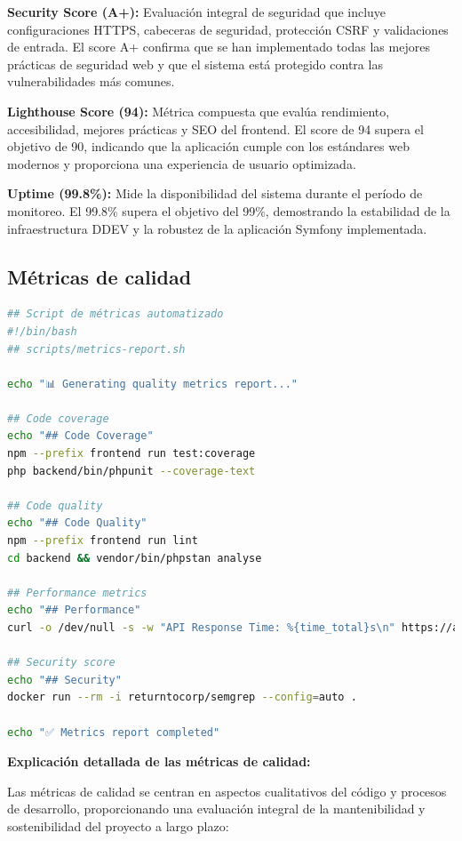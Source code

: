 \documentclass[12pt,a4paper,oneside]{report}
\begin{document}
\textbf{Security Score (A+):} Evaluación integral de seguridad que incluye configuraciones HTTPS, cabeceras de seguridad, protección CSRF y validaciones de entrada. El score A+ confirma que se han implementado todas las mejores prácticas de seguridad web y que el sistema está protegido contra las vulnerabilidades más comunes.

\textbf{Lighthouse Score (94):} Métrica compuesta que evalúa rendimiento, accesibilidad, mejores prácticas y SEO del frontend. El score de 94 supera el objetivo de 90, indicando que la aplicación cumple con los estándares web modernos y proporciona una experiencia de usuario optimizada.

\textbf{Uptime (99.8\%):} Mide la disponibilidad del sistema durante el período de monitoreo. El 99.8\% supera el objetivo del 99\%, demostrando la estabilidad de la infraestructura DDEV y la robustez de la aplicación Symfony implementada.

\subsection{Métricas de calidad}\label{muxe9tricas-de-calidad}

\begin{lstlisting}[language=bash]
## Script de métricas automatizado
#!/bin/bash
## scripts/metrics-report.sh

echo "📊 Generating quality metrics report..."

## Code coverage
echo "## Code Coverage"
npm --prefix frontend run test:coverage
php backend/bin/phpunit --coverage-text

## Code quality
echo "## Code Quality"
npm --prefix frontend run lint
cd backend && vendor/bin/phpstan analyse

## Performance metrics
echo "## Performance"
curl -o /dev/null -s -w "API Response Time: %{time_total}s\n" https://api.tfg-platform.com/health

## Security score
echo "## Security"
docker run --rm -i returntocorp/semgrep --config=auto .

echo "✅ Metrics report completed"
\end{lstlisting}

\textbf{Explicación detallada de las métricas de calidad:}

Las métricas de calidad se centran en aspectos cualitativos del código y procesos de desarrollo, proporcionando una evaluación integral de la mantenibilidad y sostenibilidad del proyecto a largo plazo:
\end{document}
